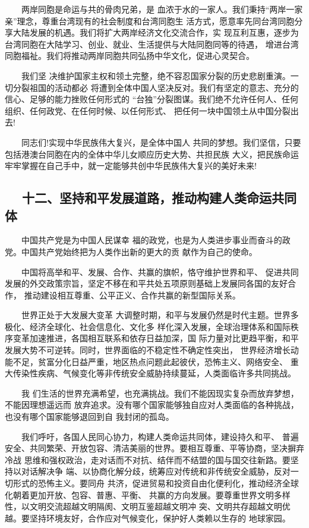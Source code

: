 \documentclass[11pt]{ctexart}
\begin{document}
{{{{　　两岸同胞是命运与共的骨肉兄弟，是
血浓于水的一家人。我们秉持“两岸一家亲”理念，尊重台湾现有的社会制度和台湾同胞生
活方式，愿意率先同台湾同胞分享大陆发展的机遇。我们将扩大两岸经济文化交流合作，实
现互利互惠，逐步为台湾同胞在大陆学习、创业、就业、生活提供与大陆同胞同等的待遇，
增进台湾同胞福祉。我们将推动两岸同胞共同弘扬中华文化，促进心灵契合。

　　我们坚
决维护国家主权和领土完整，绝不容忍国家分裂的历史悲剧重演。一切分裂祖国的活动都必
将遭到全体中国人坚决反对。我们有坚定的意志、充分的信心、足够的能力挫败任何形式的
“台独”分裂图谋。我们绝不允许任何人、任何组织、任何政党、在任何时候、以任何形式、
把任何一块中国领土从中国分裂出去!

　　同志们!实现中华民族伟大复兴，是全体中国人
共同的梦想。我们坚信，只要包括港澳台同胞在内的全体中华儿女顺应历史大势、共担民族
大义，把民族命运牢牢掌握在自己手中，就一定能够共创中华民族伟大复兴的美好未来!
　
\subsection{　  十二、坚持和平发展道路，推动构建人类命运共同体}
\label{sec:org4d77a9f}

　　中国共产党是为中国人民谋幸
福的政党，也是为人类进步事业而奋斗的政党。中国共产党始终把为人类作出新的更大的贡
献作为自己的使命。

　　中国将高举和平、发展、合作、共赢的旗帜，恪守维护世界和平、
促进共同发展的外交政策宗旨，坚定不移在和平共处五项原则基础上发展同各国的友好合作，
推动建设相互尊重、公平正义、合作共赢的新型国际关系。

　　世界正处于大发展大变革
大调整时期，和平与发展仍然是时代主题。世界多极化、经济全球化、社会信息化、文化多
样化深入发展，全球治理体系和国际秩序变革加速推进，各国相互联系和依存日益加深，国
际力量对比更趋平衡，和平发展大势不可逆转。同时，世界面临的不稳定性不确定性突出，
世界经济增长动能不足，贫富分化日益严重，地区热点问题此起彼伏，恐怖主义、网络安全、
重大传染性疾病、气候变化等非传统安全威胁持续蔓延，人类面临许多共同挑战。

　　我
们生活的世界充满希望，也充满挑战。我们不能因现实复杂而放弃梦想，不能因理想遥远而
放弃追求。没有哪个国家能够独自应对人类面临的各种挑战，也没有哪个国家能够退回到自
我封闭的孤岛。

　　我们呼吁，各国人民同心协力，构建人类命运共同体，建设持久和平、
普遍安全、共同繁荣、开放包容、清洁美丽的世界。要相互尊重、平等协商，坚决摒弃冷战
思维和强权政治，走对话而不对抗、结伴而不结盟的国与国交往新路。要坚持以对话解决争
端、以协商化解分歧，统筹应对传统和非传统安全威胁，反对一切形式的恐怖主义。要同舟
共济，促进贸易和投资自由化便利化，推动经济全球化朝着更加开放、包容、普惠、平衡、
共赢的方向发展。要尊重世界文明多样性，以文明交流超越文明隔阂、文明互鉴超越文明冲
突、文明共存超越文明优越。要坚持环境友好，合作应对气候变化，保护好人类赖以生存的
地球家园。

}}}}
\end{document}

